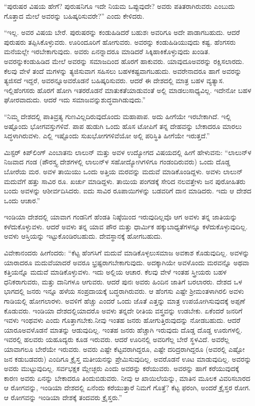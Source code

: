 “ಪುರುಷರ ವಿಷಯ ಹೇಗೆ? ಪುರುಷನಿಗೂ ಇದೇ ನಿಯಮ ಒಪ್ಪುವುದೇ? ಅವರು ಪತಿತರಾಗಿರುವರು ಎಂಬುದು ಗೊತ್ತಾದ ಮೇಲೆ ಅವರನ್ನು ಬಹಿಷ್ಕರಿಸುವರೇ?” ಎಂದು ಕೇಳಿದರು.

“ಇಲ್ಲ. ಅವರ ವಿಷಯ ಬೇರೆ. ಪುರುಷರನ್ನು ಕಂಡುಹಿಡಿದರೆ ಬಹುಶಃ ಅವರಿಗೂ ಅದೇ ಪಾಡಾಗಬಹುದು. ಆದರೆ ಪುರುಷರು ತಪ್ಪಿಸಿಕೊಳ್ಳುವರು. ಊರಿಂದೂರಿಗೆ ಹೋಗುವರು. ಅವರನ್ನು ಕಂಡುಹಿಡಿಯುವುದು ಕಷ್ಟ. ಹೆಂಗಸರು ಮನೆಯಲ್ಲೇ ಇರಬೇಕಾಗುವುದು. ಅವರು ಏನನ್ನಾದರೂ ಮಾಡಿದರೆ ಸಿಕ್ಕಿಹಾಕಿಕೊಳ್ಳುವುದು ಖಂಡಿತ. ಅವರನ್ನು\break ಕಂಡುಹಿಡಿದ ಮೇಲೆ ಅವರನ್ನು ಸಮಾಜದಿಂದ ಹೊರಗೆ ಹಾಕುವರು. ಯಾವುದೂ\break ಅವರನ್ನು ರಕ್ಷಿಸಲಾರದು. ಕೆಲವು ವೇಳೆ ತಂದೆ ಮಗಳನ್ನು ತ್ಯಜಿಸುವಾಗ ಸಹಿಸಲು ಬಹಳ\break ಕಷ್ಟವಾಗಬಹುದು. ಅವರೇನಾದರೂ ಹಾಗೆ ಅವರನ್ನು ತ್ಯಜಿಸದೆ ಇದ್ದರೆ, ಅವರನ್ನೂ\break ಅವರೊಡನೆ ಬಹಿಷ್ಕರಿಸುವರು. ಆದರೆ ಈ ದೇಶದಲ್ಲಿ ಮಾತ್ರ ಬಹಳ ವ್ಯತ್ಯಾಸ. ಇಲ್ಲಿ\break ಹೆಂಗಸರು ಹೊರಗೆ ಹೋಗಿ ಇತರರೊಡನೆ ಮಾತುಕತೆಯಾಡುವಂತೆ ಅಲ್ಲಿ ಮಾಡಲು\break ಸಾಧ್ಯವಿಲ್ಲ. ಇದೇನೋ ಬಹಳ ಘೋರವಾದುದು. ಆದರೆ ಇದು ಸಮಾಜವನ್ನು\break ಶುದ್ಧವಾಗಿಡುವುದು.”

“ನಿಮ್ಮ ದೇಶದಲ್ಲಿ ಪಾತಿವ್ರತ್ಯ ಗುಣವಿಲ್ಲದಿರುವುದೊಂದು ಮಹಾಪಾಪ. ಅದು ಹೀಗೆಯೇ ಇರಬೇಕಾಗಿದೆ. ಇಲ್ಲಿ ಅಷ್ಟೊಂದು ಭೋಗವಸ್ತುಗಳಿವೆ. ಪಾಪ ಹುಡುಗಿ ಒಂದು ಹೊಸ ಟೋಪಿಗೆ ತನ್ನ ದೇಹವನ್ನು ಬೇಕಾದರೂ ಮಾರಲು ಸಿದ್ಧಳಾಗಿರುವಳು. ಎಲ್ಲಿ ಇಷ್ಟೊಂದು ಸುಖಭೋಗಗಳಿವೆಯೋ ಅಲ್ಲಿ ಪರಿಸ್ಥಿತಿ ಹೀಗೆಯೇ ಇರುತ್ತದೆ.”

ಮಿಸ್ಟರ್​ ಕಿಪ್​ಲಿಂಗ್​ ಎಂಬಾತನು ಲಾಲುನ್​ ಮತ್ತು ಅವಳ ಉದ್ಯೋಗದ ವಿಷಯದಲ್ಲಿ ಹೀಗೆ ಹೇಳುವನು: “ಲಾಲುನ್​ಳ ನಿಜವಾದ ಗಂಡ (ಪೌರಸ್ತ್ಯ ದೇಶಗಳಲ್ಲಿ ಲಾಲುನ್​ಳ ಸಹೋದ್ಯೋಗಿಗಳಿಗೂ ಗಂಡಂದಿರುವರು) ಒಂದು ದೊಡ್ಡ ಬೋರೆಯ ಮರ. ಅವಳ ತಾಯಿಯು ಒಂದು ಅತ್ತಿಯ ಮರವನ್ನು ಮದುವೆ ಮಾಡಿಕೊಂಡಿದ್ದಳು. ಅವಳು ಲಾಲುನ್​ ಮದುವೆಗೆ ಹತ್ತು ಸಾವಿರ ರೂ. ಖರ್ಚು ಮಾಡಿದ್ದಳು. ತಾಯಿಯ ಪಂಗಡಕ್ಕೆ ಸೇರಿದ ನಲವತ್ತೇಳು ಜನ ಪುರೋಹಿತರು ಬಂದು ಅವಳನ್ನು ಆಶೀರ್ವದಿಸಿದರು. ಐದು ಸಾವಿರ ರೂಪಾಯಿಗಳನ್ನು ಬಡವರಿಗೆ ದಾನ ಮಾಡಿದರು. ಇದು ಆ ದೇಶದ ಒಂದು ಆಚಾರ.”

ಇಂಡಿಯಾ ದೇಶದಲ್ಲಿ ಯಾವಾಗ ಗಂಡನಿಗೆ ಹೆಂಡತಿ ನಿಷ್ಠೆಯಿಂದ ಇರುವುದಿಲ್ಲವೊ ಆಗ ಅವಳು ತನ್ನ ಜಾತಿಯನ್ನು ಕಳೆದುಕೊಳ್ಳುವಳು. ಆದರೆ ಅವಳು ತನ್ನ ಯಾವ ಪೌರ ಮತ್ತು ಧಾರ್ಮಿಕ ಹಕ್ಕುಬಾಧ್ಯತೆಗಳನ್ನೂ ಕಳೆದುಕೊಳ್ಳುವುದಿಲ್ಲ. ಅವಳು ಆಸ್ತಿಯನ್ನು ಇಟ್ಟುಕೊಂಡಿರಬಹುದು. ದೇವಸ್ಥಾನಕ್ಕೆ ಹೋಗಬಹುದು.

ವಿವೇಕಾನಂದರು ಹೀಗೆಂದರು: “ಕೆಟ್ಟ ಹೆಂಗಸಿಗೆ ಮದುವೆ ಮಾಡಿಕೊಳ್ಳಲು\break ಸಮಾಜ ಅವಕಾಶ ಕೊಡುವುದಿಲ್ಲ. ಅವಳನ್ನು ಯಾರಾದರೂ ಮದುವೆಯಾದರೆ ಅವರೂ ಭ್ರಷ್ಟರಾಗಬೇಕಾಗುವುದು. ಅದಕ್ಕಾಗಿಯೇ ಅವಳೊಂದು ಮರವನ್ನೊ ಅಥವಾ ಕತ್ತಿಯನ್ನೊ ಮದುವೆ ಮಾಡಿಕೊಳ್ಳುವಳು. ಇದು ಅಲ್ಲಿಯ ಆಚಾರ. ಕೆಲವು ವೇಳೆ ಇಂತಹ ಸ್ತ್ರೀಯರು ಬಹಳ ಧನಿಕರಾಗುವರು, ಮತ್ತು ದಾನಿಗಳೂ ಆಗುವರು. ಆದರೆ ಪುನಃ ಅವರು ಹಿಂದಿನ ಜಾತಿಗೆ ಬರಲಾರರು. ದೇಶದ ಒಳ ಭಾಗದಲ್ಲಿ ಜನರು ಇನ್ನೂ ಹಳೆಯ ಸಂಪ್ರದಾಯಕ್ಕೆ ಬದ್ಧರಾಗಿರುವರು. ಆ ಹೆಂಗಸು ಎಷ್ಟೇ ಶ‍್ರೀಮಂತಳಾಗಿರಲಿ ಅವಳು ಗಾಡಿಯಲ್ಲಿ ಹೋಗಲಾರಳು. ಅವಳಿಗೆ ಹೆಚ್ಚು ಎಂದರೆ ಒಂದು ಜೊತೆ ಎತ್ತನ್ನು ಮಾತ್ರ ಉಪಯೋಗಿಸುವುದಕ್ಕೆ ಅಪ್ಪಣೆ ಕೊಡುವರು. ಇಂಡಿಯಾ ದೇಶದಲ್ಲಿಯಾದರೊ ಅವಳು ತನ್ನದೇ ರೀತಿಯ ವಸ್ತ್ರವನ್ನು ಉಡಬೇಕು. ಏಕೆಂದರೆ ಜನರಿಗೆ ಇವಳು ಇಂಥವಳು ಎಂದು ಗೊತ್ತಾಗಬೇಕು.\break ನೀವು ಇಂತಹ ಜನರು ಹೋಗುತ್ತಿರುವುದನ್ನು ನೋಡಬಹುದು. ಆದರೆ ಯಾರೂ\break ಅವಳೊಡನೆ ಮಾತನ್ನು ಆಡುವುದಿಲ್ಲ. ಇಂತಹ ಜನರು ಹೆಚ್ಚಾಗಿ ಇರುವುದು ದೊಡ್ಡ ದೊಡ್ಡ ಊರುಗಳಲ್ಲಿ. ಇವರಲ್ಲಿ ಹಲವರು ಯಹೂದ್ಯರು ಕೂಡ ಇರುವರು. ಆದರೆ ಊರಿನಲ್ಲಿ ಅವರಿಗೆಲ್ಲ ಬೇರೆ ಸ್ಥಳವಿದೆ. ಅವರೆಲ್ಲ ಯಾವಾಗಲೂ ಬೇರೆಯೇ ಇರುವರು. ಅವರು ಎಷ್ಟೇ ಕೆಟ್ಟವರಾಗಿದ್ದರೂ, ಎಷ್ಟೇ ದರಿದ್ರರಾಗಿದ್ದರೂ (ಅವರಲ್ಲಿ ಎಷ್ಟೋ ಜನ ಕಡುಬಡವರು) ಎಂದಿಗೂ ಕ್ರೈಸ್ತ ಮತೀಯನನ್ನು ಪ್ರೇಮಿಸುವುದಿಲ್ಲ. ಅವರೊಡನೆ ಊಟ ಮಾಡುವುದಿಲ್ಲ. ಅವರನ್ನು ಅವರು ಮುಟ್ಟುವುದಿಲ್ಲ. ಸರ್ವಭಕ್ಷಕ ಮ್ಲೇಚ್ಛರು ಎಂದು ಅವರನ್ನು ಕರೆಯುವರು. ಅವರನ್ನು ಹಾಗೆ ಕರೆಯುವುದಕ್ಕೆ ಕಾರಣ ಅವರು ಏನನ್ನು ಬೇಕಾದರೂ ತಿಂದುಬಿಡುವರು. ನೀವು ಆ ಖಾಯಿಲೆಯನ್ನು, ಮಾತಿನ ಮೂಲಕ ವಿವರಿಸಬಾರದ ಆ ರೋಗವನ್ನು, ಇಂಡಿಯಾ ದೇಶದಲ್ಲಿ ಏನೆಂದು ಕರೆಯುತ್ತಾರೆ ನಿಮಗೆ ಗೊತ್ತೆ? ಕೆಟ್ಟ ಫರಂಗಿ, ಅಂದರೆ ಕ್ರೈಸ್ತರ ರೋಗ. ಆ ರೋಗವನ್ನು ಇಂಡಿಯಾ ದೇಶಕ್ಕೆ ತಂದವರು ಕ್ರೈಸ್ತರು.”

